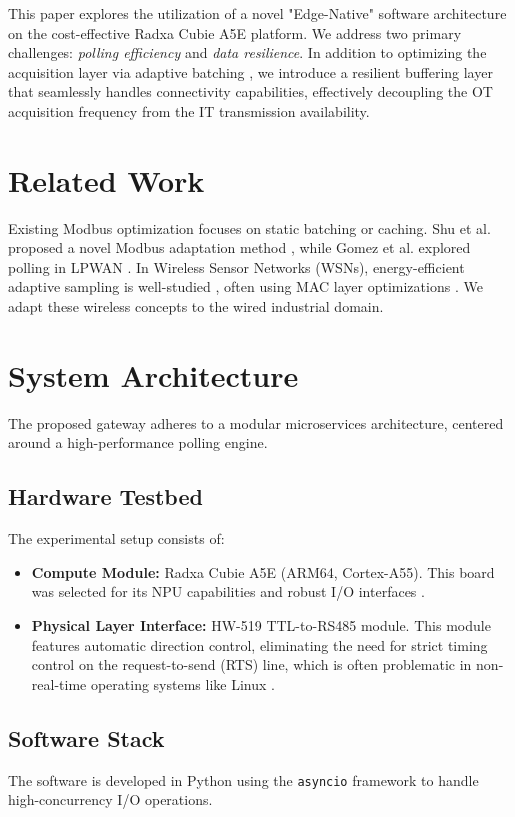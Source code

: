 \documentclass[journal]{IEEEtran}
\begin{document}
This paper explores the utilization of a novel "Edge-Native" software architecture on the cost-effective Radxa Cubie A5E platform. We address two primary challenges: \textit{polling efficiency} and \textit{data resilience}. In addition to optimizing the acquisition layer via adaptive batching \cite{modbus_performance}, we introduce a resilient buffering layer that seamlessly handles connectivity capabilities, effectively decoupling the OT acquisition frequency from the IT transmission availability.

\section{Related Work}
Existing Modbus optimization focuses on static batching or caching. Shu et al. proposed a novel Modbus adaptation method \cite{shu2019novel}, while Gomez et al. explored polling in LPWAN \cite{adaptive_polling}. In Wireless Sensor Networks (WSNs), energy-efficient adaptive sampling is well-studied \cite{adaptive_wsn_energy}, often using MAC layer optimizations \cite{dynamic_polling_mac}. We adapt these wireless concepts to the wired industrial domain.

\section{System Architecture}
The proposed gateway adheres to a modular microservices architecture, centered around a high-performance polling engine.

\subsection{Hardware Testbed}
The experimental setup consists of:
\begin{itemize}
    \item \textbf{Compute Module:} Radxa Cubie A5E (ARM64, Cortex-A55). This board was selected for its NPU capabilities and robust I/O interfaces \cite{radxa_spec}.
    \item \textbf{Physical Layer Interface:} HW-519 TTL-to-RS485 module. This module features automatic direction control, eliminating the need for strict timing control on the request-to-send (RTS) line, which is often problematic in non-real-time operating systems like Linux \cite{hw519_spec}.
\end{itemize}

\subsection{Software Stack}
The software is developed in Python using the \texttt{asyncio} framework to handle high-concurrency I/O operations.
\end{document}

